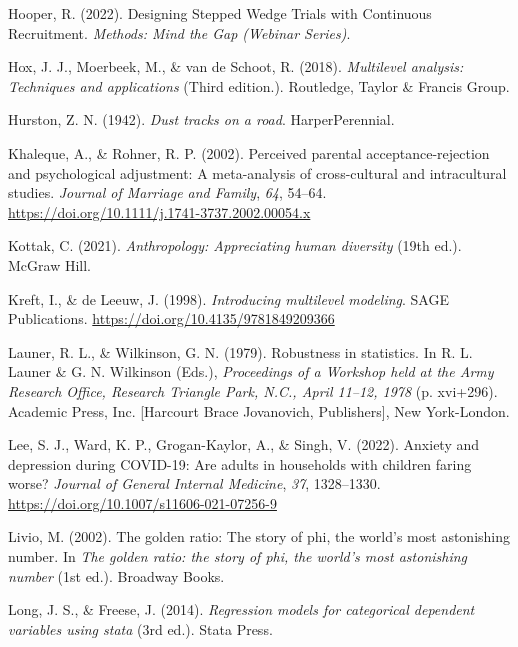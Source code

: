 \documentclass[
  letterpaper,
  DIV=11,
  numbers=noendperiod]{scrreprt}
\newlength{\cslhangindent}
\newenvironment{CSLReferences}[2] %
 {\begin{list}{}{%
  \setlength{\itemindent}{0pt}
  \setlength{\leftmargin}{0pt}
  \setlength{\parsep}{0pt}
  \ifodd #1
   \setlength{\leftmargin}{\cslhangindent}
   \setlength{\itemindent}{-1\cslhangindent}
  \fi
  \setlength{\itemsep}{#2\baselineskip}}}
 {\end{list}}
\begin{document}
\begin{CSLReferences}{1}{0}
Hooper, R. (2022). {Designing Stepped Wedge Trials with Continuous
Recruitment}. \emph{Methods: Mind the Gap (Webinar Series)}.

Hox, J. J., Moerbeek, M., \& van de Schoot, R. (2018). \emph{Multilevel
analysis: Techniques and applications} (Third edition.). Routledge,
Taylor \& Francis Group.

Hurston, Z. N. (1942). \emph{Dust tracks on a road}. HarperPerennial.

Khaleque, A., \& Rohner, R. P. (2002). Perceived parental
acceptance-rejection and psychological adjustment: A meta-analysis of
cross-cultural and intracultural studies. \emph{Journal of Marriage and
Family}, \emph{64}, 54--64.
\url{https://doi.org/10.1111/j.1741-3737.2002.00054.x}

Kottak, C. (2021). \emph{Anthropology: Appreciating human diversity}
(19th ed.). McGraw Hill.

Kreft, I., \& de Leeuw, J. (1998). \emph{Introducing multilevel
modeling}. SAGE Publications.
\url{https://doi.org/10.4135/9781849209366}

Launer, R. L., \& Wilkinson, G. N. (1979). Robustness in statistics. In
R. L. Launer \& G. N. Wilkinson (Eds.), \emph{Proceedings of a
{W}orkshop held at the {A}rmy {R}esearch {O}ffice, {R}esearch {T}riangle
{P}ark, {N}.{C}., {A}pril 11--12, 1978} (p. xvi+296). Academic Press,
Inc. {[}Harcourt Brace Jovanovich, Publishers{]}, New York-London.

Lee, S. J., Ward, K. P., Grogan-Kaylor, A., \& Singh, V. (2022). Anxiety
and depression during {COVID-19}: Are adults in households with children
faring worse? \emph{Journal of General Internal Medicine}, \emph{37},
1328--1330. \url{https://doi.org/10.1007/s11606-021-07256-9}

Livio, M. (2002). The golden ratio: The story of phi, the world's most
astonishing number. In \emph{The golden ratio: the story of phi, the
world's most astonishing number} (1st ed.). Broadway Books.

Long, J. S., \& Freese, J. (2014). \emph{Regression models for
categorical dependent variables using stata} (3rd ed.). Stata Press.


\end{CSLReferences}
\end{document}
